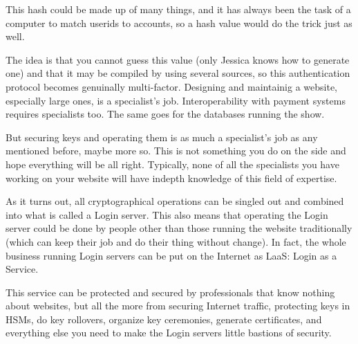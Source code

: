 This hash could be made up of many things, and it has always been the task of a computer to match userids to accounts, so a hash value would do the trick just as well.
\par
The idea is that you cannot guess this value
(only Jessica knows how to generate one)
and that it may be compiled by using several sources,
so this authentication protocol becomes genuinally multi-factor.
Designing and maintainig a website, especially large ones, is a specialist's job.
Interoperability with payment systems requires specialists too.
The same goes for the databases running the show.
\par
But securing keys and operating them is as much a specialist's job as any mentioned before, maybe more so.
This is not something you do on the side and hope everything will be all right.
Typically, none of all the specialists you have working on your website will have indepth knowledge of this field of expertise.
\par
As it turns out, all cryptographical operations can be singled out and combined into what is called a Login server.
This also means that operating the Login server could be done by people other than those running the website traditionally
(which can keep their job and do their thing without change).
In fact, the whole business running Login servers can be put on the Internet as LaaS: Login as a Service.
\par
This service can be protected and secured by professionals that know nothing about websites,
but all the more from securing Internet traffic,
protecting keys in HSMs,
do key rollovers,
organize key ceremonies,
generate certificates,
and everything else you need to make the Login servers little bastions of security.



